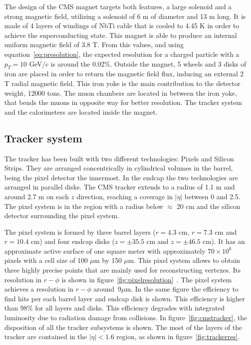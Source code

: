 The design of the CMS magnet targets both features, a large solenoid and a strong magnetic field, utilizing a solenoid of 6 m of diameter and 13 m long. It is made of 4 layers of windings of NbTi cable that is cooled to 4.45 K in order to achieve the superconducting state. This magnet is able to produce an internal uniform magnetic field of 3.8 T. From this values, and using equation~\ref{eq:presolution}, the expected resolution for a charged particle with a $p_{T}=10$ GeV/c is around the 0.02\%. Outside the magnet, 5 wheels and 3 disks of iron are placed in order to return the magnetic field flux, inducing an external 2 T radial magnetic field. This iron yoke is the main contribution to the detector weight, 12000 tons. The muon chambers are located in between the iron yoke, that bends the muons in opposite way for better resolution. The tracker system and the calorimeters are located inside the magnet. 

\subsection{Tracker system}
\label{sec:tracker}

The tracker has been built with two different technologies: Pixels and Silicon Strips. They are arranged concentrically in cylindrical volumes in the barrel, being the pixel detector the innermost. In the endcap the two technologies are arranged in parallel disks. The CMS tracker extends to a radius of 1.1 m and around 2.7 m on each $z$ direction, reaching a coverage in $|\eta|$ between 0 and 2.5. The pixel system is in the region with a radius below $\approx$ 20 cm and the silicon detector surrounding the pixel system. %

The pixel system is formed by three barrel layers ($r=4.3$ cm, $r=7.3$ cm and $r=10.4$ cm) and four endcap disks ($z=\pm 35.5$ cm and $z=\pm 46.5$ cm). It has an approximate active surface of one square meter with approximately $70\times10^{6}$ pixels with a cell size of 100 $\mu$m by 150 $\mu$m. This pixel system allows to obtain three highly precise points that are mainly used for reconstructing vertexes. Its resolution in $r-\phi$ is shown in figure~\ref{fig:pixelresolution}~\cite{Brochet:1956723}. The pixel system achieves a resolution in $r-\phi$ around~${9\mu\text{m}}$. In the same figure the efficiency to find hits per each barrel layer and endcap disk is shown. This efficiency is higher than 98\% for all layers and disks. This efficiency degrades with integrated luminosity due to radiation damage from collisions. In figure~\ref{fig:cmstracker}, the disposition of all the tracker subsystems is shown. The most of the layers of the tracker are contained in the $|\eta|<1.6$ region, as shown in figure~\ref{fig:trackerres}.

